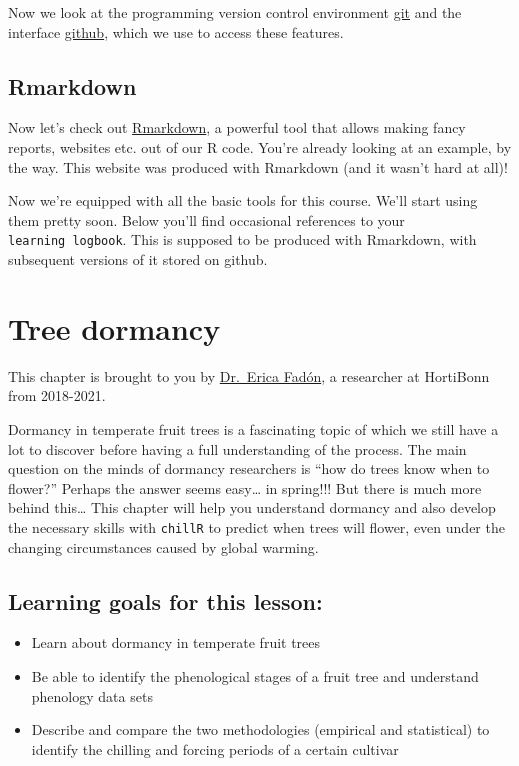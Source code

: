 \documentclass[
]{book}
\providecommand{\tightlist}{%
  \setlength{\itemsep}{0pt}\setlength{\parskip}{0pt}}
\begin{document}
Now we look at the programming version control environment \href{https://git-scm.com/}{git} and the interface \href{https://github.com/}{github}, which we use to access these features.

\hypertarget{rmarkdown}{%
\section{Rmarkdown}\label{rmarkdown}}

Now let's check out \href{https://rmarkdown.rstudio.com/}{Rmarkdown}, a powerful tool that allows making fancy reports, websites etc. out of our R code. You're already looking at an example, by the way. This website was produced with Rmarkdown (and it wasn't hard at all)!

Now we're equipped with all the basic tools for this course. We'll start using them pretty soon. Below you'll find occasional references to your \texttt{learning\ logbook}. This is supposed to be produced with Rmarkdown, with subsequent versions of it stored on github.

\hypertarget{tree-dormancy}{%
\chapter{Tree dormancy}\label{tree-dormancy}}

This chapter is brought to you by \href{https://scholar.google.de/citations?hl=de\&user=MTmTnnsAAAAJ}{Dr.~Erica Fadón}, a researcher at HortiBonn from 2018-2021.

Dormancy in temperate fruit trees is a fascinating topic of which we still have a lot to discover before having a full understanding of the process. The main question on the minds of dormancy researchers is ``how do trees know when to flower?'' Perhaps the answer seems easy\ldots{} in spring!!! But there is much more behind this\ldots{} This chapter will help you understand dormancy and also develop the necessary skills with \texttt{chillR} to predict when trees will flower, even under the changing circumstances caused by global warming.

\hypertarget{learning-goals-for-this-lesson}{%
\section{Learning goals for this lesson:}\label{learning-goals-for-this-lesson}}

\begin{itemize}
\tightlist
\item
  Learn about dormancy in temperate fruit trees
\item
  Be able to identify the phenological stages of a fruit tree and understand phenology data sets
\item
  Describe and compare the two methodologies (empirical and statistical) to identify the chilling and forcing periods of a certain cultivar
\end{itemize}
\end{document}

